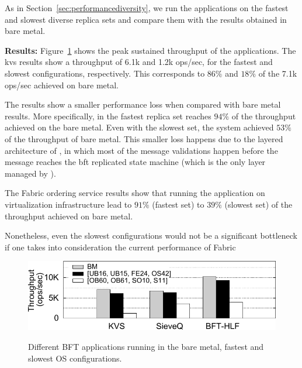 As in Section~\ref{sec:performancediversity}, we run the applications on the fastest and slowest diverse replica sets and compare them with the results obtained in bare metal.

\textbf{Results:}
Figure~\ref{fig:apps} shows the peak sustained throughput of the applications. 
The \gls{kvs} results show a throughput of 6.1k and 1.2k ops/sec, for the fastest and slowest configurations, respectively.
This corresponds to $86\%$ and $18\%$ of the 7.1k ops/sec achieved on bare metal.

The \sieveq results show a smaller performance loss when compared with bare metal results.
More specifically, \sieveq in the fastest replica set reaches $94\%$ of the throughput achieved on the bare metal.
Even with the slowest set, the system achieved $53\%$ of the throughput of bare metal.
This smaller loss happens due to the layered architecture of \sieveq, in which most of the message validations happen before the message reaches the \gls{bft} replicated state machine (which is the only layer managed by \system).

The Fabric ordering service results show that running the application on \system virtualization infrastructure lead to $91\%$ (fastest set) to $39\%$ (slowest set) of the throughput achieved on bare metal. 

Nonetheless, even the slowest configurations would not be a significant bottleneck if one takes into consideration the current performance of Fabric~\cite{Sousa:2018}

\begin{figure}[t]
\begin{center}
\includegraphics[width=\columnwidth]{images/gnuplot/vagrant/runs_apps/throughput.pdf}
\vspace{-5mm}
\caption{Different BFT applications running in the bare metal, fastest and slowest OS configurations.}
\vspace{-3mm}
\label{fig:apps}
\end{center}
\end{figure}



